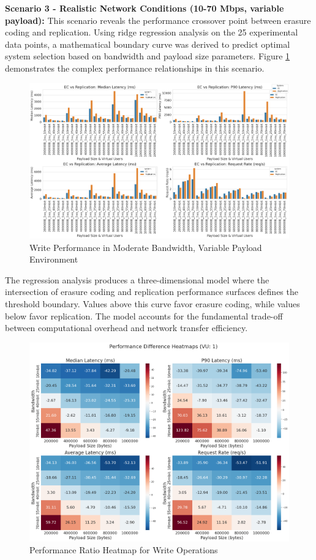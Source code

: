 \textbf{Scenario 3 - Realistic Network Conditions (10-70 Mbps, variable payload):} This scenario reveals the performance crossover point between erasure coding and replication. Using ridge regression analysis on the 25 experimental data points, a mathematical boundary curve was derived to predict optimal system selection based on bandwidth and payload size parameters. Figure \ref{fig:write-bigload-avgnet} demonstrates the complex performance relationships in this scenario.

\begin{figure}[ht]
\centering
\includegraphics[width=\columnwidth]{resources/chapter-4/write_bigload_avgnet.png}
\caption{Write Performance in Moderate Bandwidth, Variable Payload Environment}
\label{fig:write-bigload-avgnet}
\end{figure}

The regression analysis produces a three-dimensional model where the intersection of erasure coding and replication performance surfaces defines the threshold boundary. Values above this curve favor erasure coding, while values below favor replication. The model accounts for the fundamental trade-off between computational overhead and network transfer efficiency.

\begin{figure}[ht]
\centering
\includegraphics[width=\columnwidth]{resources/chapter-4/write_bigload_avgnet_heatmap.png}
\caption{Performance Ratio Heatmap for Write Operations}
\label{fig:write-heatmap}
\end{figure}

